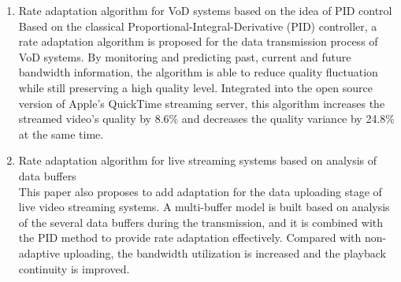 \begin{eabstract}
\begin{enumerate}
\item {Rate adaptation algorithm for VoD systems based on the idea of PID control}\\
Based on the classical Proportional-Integral-Derivative (PID) controller, a rate adaptation algorithm is proposed for the data transmission process of VoD systems. By monitoring and predicting past, current and future bandwidth information, the algorithm is able to reduce quality fluctuation while still preserving a high quality level. Integrated into the open source version of Apple's QuickTime streaming server, this algorithm increases the streamed video's quality by 8.6\% and decreases the quality variance by 24.8\% at the same time.
\item {Rate adaptation algorithm for live streaming systems based on analysis of data buffers}\\
This paper also proposes to add adaptation for the data uploading stage of live video streaming systems. A multi-buffer model is built based on analysis of the several data buffers during the transmission, and it is combined with the PID method to provide rate adaptation effectively. Compared with non-adaptive uploading, the bandwidth utilization is increased and the playback continuity is improved.
\end{enumerate}
\end{eabstract}